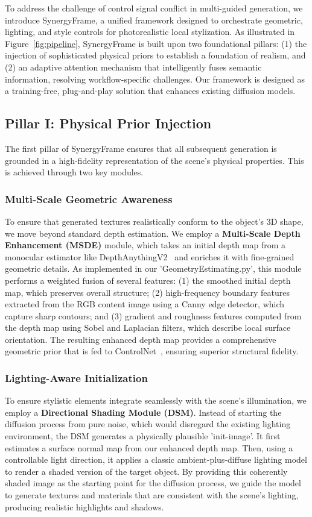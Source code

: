 \documentclass[letterpaper]{article} %
\begin{document}
To address the challenge of control signal conflict in multi-guided generation, we introduce SynergyFrame, a unified framework designed to orchestrate geometric, lighting, and style controls for photorealistic local stylization. As illustrated in Figure~\ref{fig:pipeline}, SynergyFrame is built upon two foundational pillars: (1) the injection of sophisticated physical priors to establish a foundation of realism, and (2) an adaptive attention mechanism that intelligently fuses semantic information, resolving workflow-specific challenges. Our framework is designed as a training-free, plug-and-play solution that enhances existing diffusion models.

\subsection{Pillar I: Physical Prior Injection}
\label{sec:priors}

The first pillar of SynergyFrame ensures that all subsequent generation is grounded in a high-fidelity representation of the scene's physical properties. This is achieved through two key modules.

\subsubsection{Multi-Scale Geometric Awareness}
To ensure that generated textures realistically conform to the object's 3D shape, we move beyond standard depth estimation. We employ a \textbf{Multi-Scale Depth Enhancement (MSDE)} module, which takes an initial depth map from a monocular estimator like DepthAnythingV2~\cite{yin2024depthanythingv2} and enriches it with fine-grained geometric details. As implemented in our 'GeometryEstimating.py', this module performs a weighted fusion of several features: (1) the smoothed initial depth map, which preserves overall structure; (2) high-frequency boundary features extracted from the RGB content image using a Canny edge detector, which capture sharp contours; and (3) gradient and roughness features computed from the depth map using Sobel and Laplacian filters, which describe local surface orientation. The resulting enhanced depth map provides a comprehensive geometric prior that is fed to ControlNet~\cite{zhang2023controlnet}, ensuring superior structural fidelity.
\subsubsection{Lighting-Aware Initialization}
To ensure stylistic elements integrate seamlessly with the scene's illumination, we employ a \textbf{Directional Shading Module (DSM)}. Instead of starting the diffusion process from pure noise, which would disregard the existing lighting environment, the DSM generates a physically plausible 'init-image'. It first estimates a surface normal map from our enhanced depth map. Then, using a controllable light direction, it applies a classic ambient-plus-diffuse lighting model to render a shaded version of the target object. By providing this coherently shaded image as the starting point for the diffusion process, we guide the model to generate textures and materials that are consistent with the scene's lighting, producing realistic highlights and shadows.
\end{document}
